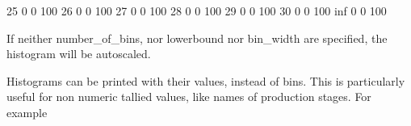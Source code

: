 \documentclass[letterpaper,10pt,english]{sphinxmanual}
\begin{document}
\begin{sphinxVerbatim}[commandchars=\\\{\}]
       25             0       0   100                                                                                   \textbar{}
       26             0       0   100                                                                                   \textbar{}
       27             0       0   100                                                                                   \textbar{}
       28             0       0   100                                                                                   \textbar{}
       29             0       0   100                                                                                   \textbar{}
       30             0       0   100                                                                                   \textbar{}
          inf         0       0   100
\end{sphinxVerbatim}

If neither number\_of\_bins, nor lowerbound nor bin\_width are specified, the histogram will be autoscaled.

Histograms can be printed with their values, instead of bins. This is particularly useful for non
numeric tallied values, like names of production stages. For example

\begin{sphinxVerbatim}[commandchars=\\\{\}]
  
           

                          
                               
                            
                              
                                
                             
                               
                                
\end{sphinxVerbatim}
\end{document}
